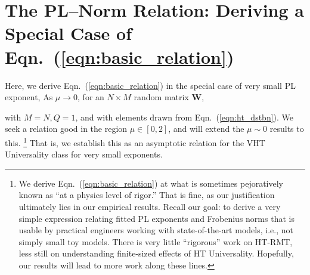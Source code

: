 

\newpage


\section{The PL--Norm Relation: Deriving a Special Case of Eqn.~(\ref{eqn:basic_relation})}
\label{sxn:appendix-derivation-pl-norm-relation}

Here, we derive Eqn.~(\ref{eqn:basic_relation}) in the special case of very small PL exponent, 
As 
$\mu \rightarrow 0$, 
for an $N \times M$ random matrix $\mathbf{W}$, {with $M=N, Q=1$, and with elements drawn from Eqn.~(\ref{eqn:ht_dstbn}).%
We seek a relation good in the region $\mu\in[0,2]$, and will extend the $\mu\sim 0$ results to this.
\footnote{We derive Eqn.~(\ref{eqn:basic_relation}) at what is sometimes pejoratively known as ``at a physics level of rigor.''  That is fine, as our justification ultimately lies in our empirical results.  Recall our goal: to derive a very simple expression relating fitted PL exponents and Frobenius norms that is usable by practical engineers working with state-of-the-art models, i.e., not simply small toy models.  There is very little ``rigorous'' work on HT-RMT, less still on understanding finite-sized effects of HT Universality.  Hopefully, our results will lead to more work along these lines.  }
That is, we establish this as an asymptotic relation for the VHT Universality class for very small exponents.

}

